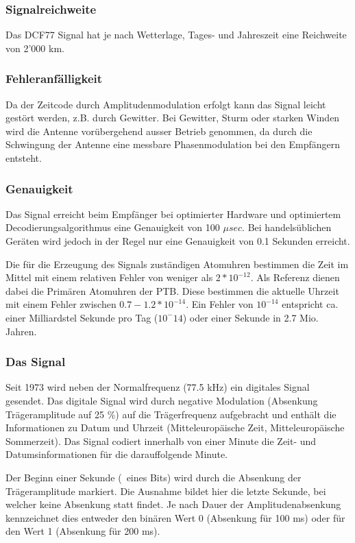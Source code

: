 \subsubsection{Signalreichweite}
Das DCF77 Signal hat je nach Wetterlage, Tages- und Jahreszeit eine Reichweite von 2'000 km. 

\subsubsection{Fehleranfälligkeit}
Da der Zeitcode durch Amplitudenmodulation erfolgt kann das Signal leicht gestört werden, z.B. durch Gewitter. Bei Gewitter, Sturm oder starken Winden wird die Antenne vorübergehend ausser Betrieb genommen, da durch die Schwingung der Antenne eine messbare Phasenmodulation bei den Empfängern entsteht.

\subsubsection{Genauigkeit}
Das Signal erreicht beim Empfänger bei optimierter Hardware und optimiertem Decodierungsalgorithmus eine Genauigkeit von 100 ${\mu}sec$. Bei handelsüblichen Geräten wird jedoch in der Regel nur eine Genauigkeit von 0.1 Sekunden erreicht.

Die für die Erzeugung des Signals zuständigen Atomuhren bestimmen die Zeit im Mittel mit einem relativen Fehler von weniger als $2*10^{-12}$. Als Referenz dienen dabei die Primären Atomuhren der PTB.
Diese bestimmen die aktuelle Uhrzeit mit einem Fehler zwischen $0.7 - 1.2 * 10^{-14}$. Ein Fehler von $10^{-14}$ entspricht ca. einer Milliardstel Sekunde pro Tag ($10^-14$) oder einer Sekunde in 2.7 Mio. Jahren.

\subsubsection{Das Signal}
Seit 1973 wird neben der Normalfrequenz (77.5 kHz) ein digitales Signal gesendet. Das digitale Signal wird durch negative Modulation (Absenkung Trägeramplitude auf 25 \%) auf die Trägerfrequenz aufgebracht und enthält die Informationen zu Datum und Uhrzeit (Mitteleuropäische Zeit, Mitteleuropäische Sommerzeit). Das Signal codiert innerhalb von einer Minute die Zeit- und Datumsinformationen für die darauffolgende Minute.

Der Beginn einer Sekunde (~eines Bits) wird durch die Absenkung der Trägeramplitude markiert. Die Ausnahme bildet hier die letzte Sekunde, bei welcher keine Absenkung statt findet. Je nach Dauer der Amplitudenabsenkung kennzeichnet dies entweder den binären Wert 0 (Absenkung für 100 ms) oder für den Wert 1 (Absenkung für 200 ms).

